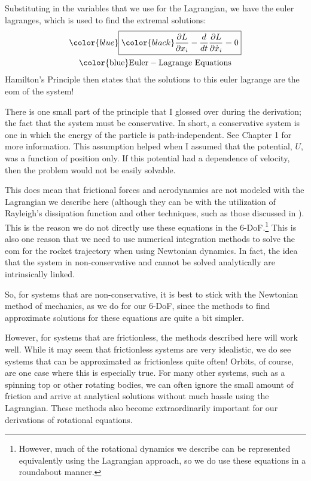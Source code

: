 Substituting in the variables that we use for the \gls{Lagrangian}, we have the \glspl{euler lagrange}, which is used to find the extremal solutions:
\begin{gather}\label{eq: Euler-Lagrange}
    \color{blue}\boxed{\color{black}\frac{\partial L}{\partial x_i}-\frac{d}{dt}\frac{\partial L}{\partial \dot{x}_i}=0}\\ \mathrm{\color{blue}Euler-Lagrange \ Equations}
\end{gather}
Hamilton's Principle then states that the solutions to this \gls{euler lagrange} are the \gls{eom} of the system!

There is one small part of the principle that I glossed over during the derivation; the fact that the system must be \gls{conservative}. In short, a \gls{conservative} system is one in which the energy of the particle is path-independent. See \cite{goldstein_classical_2008} Chapter 1 for more information. This assumption helped when I assumed that the potential, $U$, was a function of position only. If this potential had a dependence of velocity, then the problem would not be easily solvable.

This does mean that frictional forces and aerodynamics are not modeled with the \gls{Lagrangian} we describe here (although they can be with the utilization of Rayleigh's dissipation function and other techniques, such as those discussed in \cite{rabei_hamiltonian_2004}). This is the reason we do not directly use these equations in the 6-DoF.\footnote{However, much of the rotational dynamics we describe can be represented equivalently using the \gls{Lagrangian} approach, so we do use these equations in a roundabout manner.} This is also one reason that we need to use numerical integration methods to solve the \gls{eom} for the rocket trajectory when using Newtonian dynamics. In fact, the idea that the system in non-\gls{conservative} and cannot be solved analytically are intrinsically linked.

So, for systems that are non-conservative, it is best to stick with the Newtonian method of mechanics, as we do for our 6-DoF, since the methods to find approximate solutions for these equations are quite a bit simpler. 

However, for systems that are frictionless, the methods described here will work well. While it may seem that frictionless systems are very idealistic, we do see systems that can be approximated as frictionless quite often! Orbits, of course, are one case where this is especially true. For many other systems, such as a spinning top or other rotating bodies, we can often ignore the small amount of friction and arrive at analytical solutions without much hassle using the \gls{Lagrangian}. These methods also become extraordinarily important for our derivations of rotational equations.

